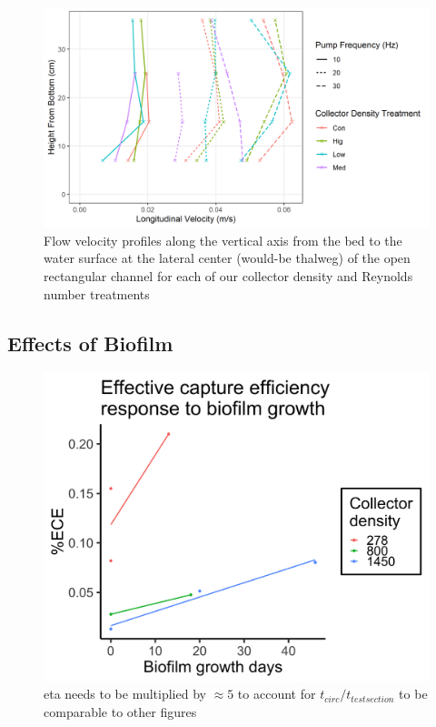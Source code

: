 \documentclass{article}
\begin{document}
\begin{figure}[H]
\includegraphics[width=6in]{vectrino.png}
\centering
\caption{Flow velocity profiles along the vertical axis from the bed to the water surface at the lateral center (would-be thalweg) of the open rectangular channel for each of our collector density and Reynolds number treatments}
\label{fig:vectrino}
\end{figure}

\subsection{Effects of Biofilm}

\begin{figure}[H]
    \centering
    \includegraphics[width=5in]{../pics/biofilm.png}
    \caption{eta needs to be multiplied by $\approx5$ to account for $t_{circ}/t_{test section}$ to be comparable to other figures}
    \label{fig:biofilm}
\end{figure}
\end{document}
